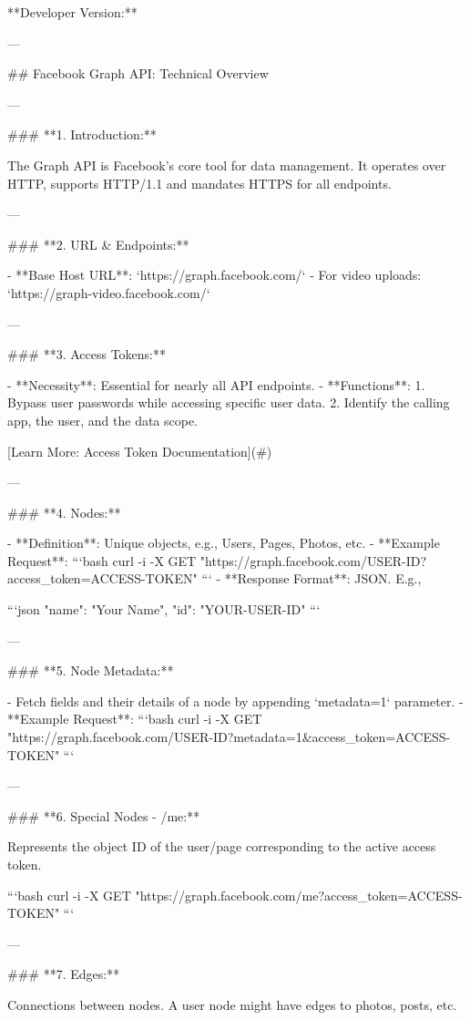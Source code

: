 **Developer Version:**

---

## Facebook Graph API: Technical Overview

---

### **1. Introduction:**

The Graph API is Facebook's core tool for data management. It operates over HTTP, supports HTTP/1.1 and mandates HTTPS for all endpoints.

---

### **2. URL & Endpoints:**

- **Base Host URL**: `https://graph.facebook.com/`
- For video uploads: `https://graph-video.facebook.com/`
  
---

### **3. Access Tokens:**

- **Necessity**: Essential for nearly all API endpoints.
- **Functions**:
  1. Bypass user passwords while accessing specific user data.
  2. Identify the calling app, the user, and the data scope.

[Learn More: Access Token Documentation](#)

---

### **4. Nodes:**

- **Definition**: Unique objects, e.g., Users, Pages, Photos, etc.
- **Example Request**:
  ```bash
  curl -i -X GET "https://graph.facebook.com/USER-ID?access_token=ACCESS-TOKEN"
  ```
- **Response Format**: JSON. E.g.,

```json
{
  "name": "Your Name",
  "id": "YOUR-USER-ID"
}
```

---

### **5. Node Metadata:**

- Fetch fields and their details of a node by appending `metadata=1` parameter.
- **Example Request**:
  ```bash
  curl -i -X GET "https://graph.facebook.com/USER-ID?metadata=1&access_token=ACCESS-TOKEN"
  ```

---

### **6. Special Nodes - /me:**

Represents the object ID of the user/page corresponding to the active access token.

```bash
curl -i -X GET "https://graph.facebook.com/me?access_token=ACCESS-TOKEN"
```

---

### **7. Edges:**

Connections between nodes. A user node might have edges to photos, posts, etc.

